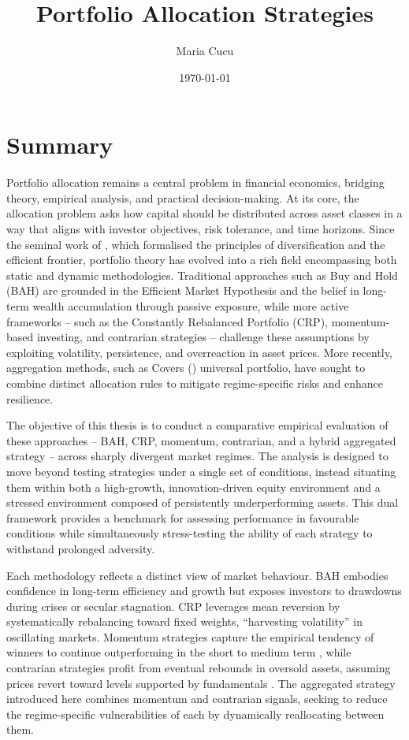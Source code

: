 \documentclass[12pt,a4paper]{report}
\title{Portfolio Allocation Strategies}
\author{Maria Cucu}
\date{\today}
\begin{document}
\maketitle

\tableofcontents
\newpage

\chapter{Summary}

Portfolio allocation remains a central problem in financial economics, bridging theory, empirical analysis, and practical decision-making. At its core, the allocation problem asks how capital should be distributed across asset classes in a way that aligns with investor objectives, risk tolerance, and time horizons. Since the seminal work of \citet{Markowitz1952}, which formalised the principles of diversification and the efficient frontier, portfolio theory has evolved into a rich field encompassing both static and dynamic methodologies. Traditional approaches such as Buy and Hold (BAH) are grounded in the Efficient Market Hypothesis \citep{Fama1970} and the belief in long-term wealth accumulation through passive exposure, while more active frameworks -- such as the Constantly Rebalanced Portfolio (CRP), momentum-based investing, and contrarian strategies -- challenge these assumptions by exploiting volatility, persistence, and overreaction in asset prices. More recently, aggregation methods, such as Cover\textquotesingle s (\citeyear{Cover1991}) universal portfolio, have sought to combine distinct allocation rules to mitigate regime-specific risks and enhance resilience.

The objective of this thesis is to conduct a comparative empirical evaluation of these approaches -- BAH, CRP, momentum, contrarian, and a hybrid aggregated strategy -- across sharply divergent market regimes. The analysis is designed to move beyond testing strategies under a single set of conditions, instead situating them within both a high-growth, innovation-driven equity environment and a stressed environment composed of persistently underperforming assets. This dual framework provides a benchmark for assessing performance in favourable conditions while simultaneously stress-testing the ability of each strategy to withstand prolonged adversity.

Each methodology reflects a distinct view of market behaviour. BAH embodies confidence in long-term efficiency and growth but exposes investors to drawdowns during crises or secular stagnation. CRP leverages mean reversion by systematically rebalancing toward fixed weights, “harvesting volatility” in oscillating markets. Momentum strategies capture the empirical tendency of winners to continue outperforming in the short to medium term \citep{Jegadeesh1993}, while contrarian strategies profit from eventual rebounds in oversold assets, assuming prices revert toward levels supported by fundamentals \citep{DeBondt1985}. The aggregated strategy introduced here combines momentum and contrarian signals, seeking to reduce the regime-specific vulnerabilities of each by dynamically reallocating between them.
\end{document}
